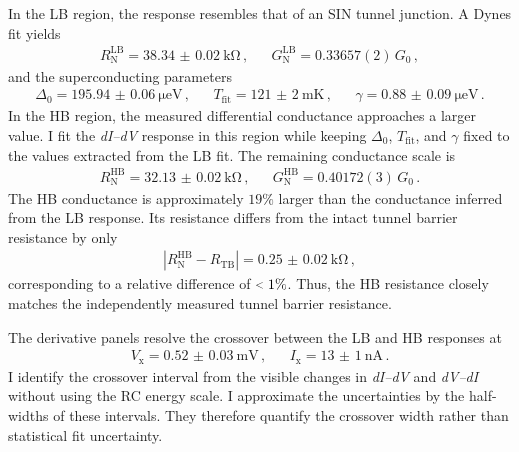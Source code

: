     In the LB region, the response resembles that of an SIN tunnel junction. A Dynes fit yields
    \begin{align}
        R_\mathrm{N}^\mathrm{LB} = \qty{38.34(2)}{\kilo\ohm}\,, &&
        G_\mathrm{N}^\mathrm{LB} = 0.33657(2)\,G_0\,,
        \label{eq:ssn-set:dynamic:lb-normal}
    \end{align}
    and the superconducting parameters
    \begin{align}
        \Delta_0 = \qty{195.94(6)}{\micro\electronvolt}\,, &&
        T_\mathrm{fit} = \qty{121(2)}{\milli\kelvin}\,, &&
        \gamma = \qty{0.88(9)}{\micro\electronvolt}\,.
        \label{eq:ssn-set:dynamic:lb-superconducting}
    \end{align}
    In the HB region, the measured differential conductance approaches a larger value. I fit the \textit{dI--dV} response in this region while keeping $\Delta_0$, $T_\mathrm{fit}$, and $\gamma$ fixed to the values extracted from the LB fit. The remaining conductance scale is
    \begin{align}
        R_\mathrm{N}^\mathrm{HB} = \qty{32.13(2)}{\kilo\ohm}\,, &&
        G_\mathrm{N}^\mathrm{HB} = 0.40172(3)\,G_0\,.
        \label{eq:ssn-set:dynamic:hb-normal}
    \end{align}
    The HB conductance is approximately $19\%$ larger than the conductance inferred from the LB response. Its resistance differs from the intact tunnel barrier resistance by only
    \begin{align}
        \left|R_\mathrm{N}^\mathrm{HB}-R_\mathrm{TB}\right| = \qty{0.25(2)}{\kilo\ohm}\,,
        \label{eq:ssn-set:dynamic:hb-barrier-difference}
    \end{align}
    corresponding to a relative difference of $\slt{} 1\%$. Thus, the HB resistance closely matches the independently measured tunnel barrier resistance.

    The derivative panels resolve the crossover between the LB and HB responses at
    \begin{align}
        V_\mathrm{x} = \qty{0.52(3)}{\milli\volt}\,, &&
        I_\mathrm{x} = \qty{13(1)}{\nano\ampere}\,.
        \label{eq:ssn-set:dynamic:crossover}
    \end{align}
    I identify the crossover interval from the visible changes in \textit{dI--dV} and \textit{dV--dI} without using the RC energy scale. I approximate the uncertainties by the half-widths of these intervals. They therefore quantify the crossover width rather than statistical fit uncertainty.

